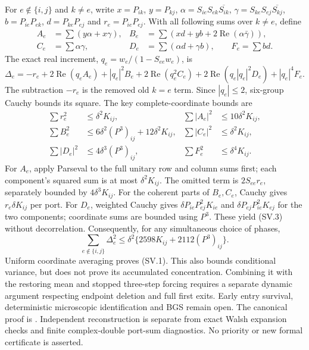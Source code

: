 For $e\notin\{i,j\}$ and $k\ne e$, write $x=P_{ik}$, $y=P_{kj}$,
$\alpha=S_{ie}S_{ek}\overline{S_{ik}}$,
$\gamma=S_{ke}S_{ej}\overline{S_{kj}}$,
$b=P_{ie}P_{ek}$, $d=P_{ke}P_{ej}$ and $r_e=P_{ie}P_{ej}$.
With all following sums over $k\ne e$, define
\[
 \begin{aligned}
 A_e&=\sum(y\alpha+x\gamma),&
 B_e&=\sum(xd+yb+2\operatorname{Re}(\alpha\bar\gamma)),\\
 C_e&=\sum\alpha\gamma,&
 D_e&=\sum(\alpha d+\gamma b),\qquad F_e=\sum bd.
 \end{aligned}
\]
The exact real increment, $q_e=w_e/(1-S_{ee}w_e)$, is
\[
 \Delta_e=-r_e+2\operatorname{Re}(q_eA_e)+|q_e|^2B_e
 +2\operatorname{Re}(q_e^2C_e)
 +2\operatorname{Re}(q_e|q_e|^2D_e)+|q_e|^4F_e.            \tag{SV.2}
\]
The subtraction $-r_e$ is the removed old $k=e$ term. Since $|q_e|\le2$,
six-group Cauchy bounds its square. The key complete-coordinate bounds are
\[
 \begin{aligned}
 \sum r_e^2&\le\delta^2K_{ij},&
 \sum|A_e|^2&\le10\delta^2K_{ij},\\
 \sum B_e^2&\le6\delta^2(P^3)_{ij}+12\delta^2K_{ij},&
 \sum|C_e|^2&\le\delta^2K_{ij},\\
 \sum|D_e|^2&\le4\delta^3(P^3)_{ij},&
 \sum F_e^2&\le\delta^4K_{ij}.
 \end{aligned}                                                   \tag{SV.3}
\]
For $A_e$, apply Parseval to the full unitary row and column sums first;
each component's squared sum is at most $\delta^2K_{ij}$. The omitted
term is $2S_{ee}r_e$, separately bounded by $4\delta^3K_{ij}$.
For the coherent parts of $B_e,C_e$, Cauchy gives
$r_e\delta K_{ij}$ per port. For $D_e$, weighted Cauchy gives
$\delta P_{ie}P_{ej}^2K_{ie}$ and
$\delta P_{ej}P_{ie}^2K_{ej}$ for the two components; coordinate sums
are bounded using $P^3$. These yield (SV.3) without decorrelation.
Consequently, for any simultaneous choice of phases,
\[
 \sum_{e\notin\{i,j\}}\Delta_e^2
    \le\delta^2\{2598K_{ij}+2112(P^3)_{ij}\}.              \tag{SV.4}
\]
Uniform coordinate averaging proves (SV.1). This also bounds conditional
variance, but does not prove its accumulated concentration. Combining it
with the restoring mean and stopped three-step forcing requires a separate
dynamic argument respecting endpoint deletion and full first exits.
Early entry survival, deterministic microscopic identification and BGS
remain open. The canonical proof is
.
Independent reconstruction is separate from exact Walsh expansion checks
and finite complex-double port-sum diagnostics. No priority or new formal
certificate is asserted.

